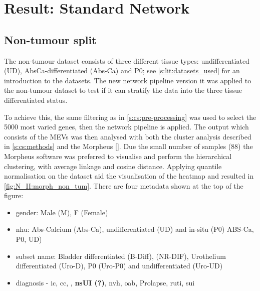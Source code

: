 \section{Result: Standard Network}  \label{s:N_II:std_net}

\vspace{3mm}
\vspace{3mm}

\subsection{Non-tumour split} \label{s:N_II:std}

The non-tumour dataset consists of three different tissue types: undifferentiated (UD), AbsCa-differentiated (Abs-Ca) and P0; see \cref{s:lit:datasets_used} for an introduction to the datasets. The new network pipeline version it was applied to the non-tumour dataset to test if it can stratify the data into the three tissue differentiated status.

To achieve this, the same filtering as in \cref{s:cs:pre-processing} was used to select the 5000 most varied genes, then the network pipeline is applied. The output which consists of the MEVs was then analysed with both the cluster analysis described in \cref{s:cs:methods} and the Morpheus \ref{}. Due the small number of samples (88) the Morpheus software was preferred to visualise and perform the hierarchical clustering, with average linkage and cosine distance. Applying quantile normalisation on the dataset aid the visualisation of the heatmap and resulted in \cref{fig:N_II:morph_non_tum}. There are four metadata shown at the top of the figure: 
\begin{itemize}
    \item gender: Male (M), F (Female)
    \item \acrfull{nhu}: Abs-Calcium (Abs-Ca), undifferentiated (UD) and in-situ (P0)
    ABS-Ca, P0, UD)
    \item subset name: Bladder differentiated (B-Diff), (NR-DIF), Urothelium differentiated (Uro-D), P0 (Uro-P0) and undifferentiated (Uro-UD)
    \item diagnosis - \acrfull{ic}, \acrfull{cc},  , \textbf{nsUI (?)},  \acrfull{nvh}, \acrfull{oab}, Prolapse, \acrfull{ruti}, \acrfull{sui}
\end{itemize} 

